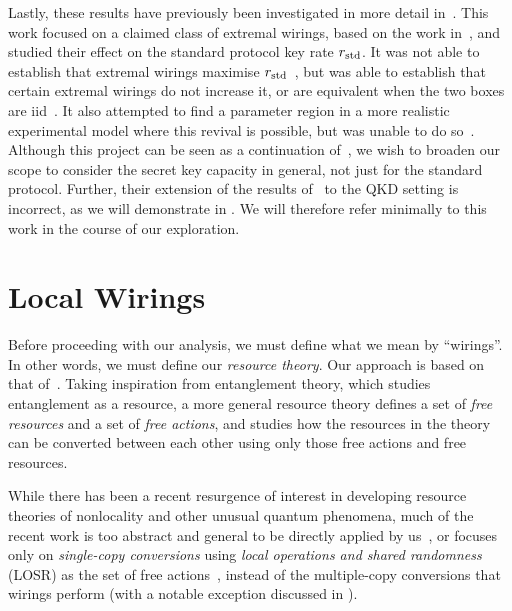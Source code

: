 \documentclass[10pt, a4paper]{article}
\numberwithin{equation}{section} %
\theoremstyle{definition}
\theoremstyle{plain}
\newcommand{\?}{\mathrel{?}} %
\newcommand{\std}{\rm std}
\begin{document}
              Lastly, these results have previously been investigated in more detail in~\cite{JanLiThesis}. This work focused on a claimed class of extremal wirings, based on the work in~\cite{ShortEntangleSwap}, and studied their effect on the standard protocol key rate \(r_{\std}\). It was not able to establish that extremal wirings maximise \(r_{\std}\)~\cite[Sec. 7.2]{JanLiThesis}, but was able to establish that certain extremal wirings do not increase it, or are equivalent when the two boxes are iid~\cite[Sec. 7.3]{JanLiThesis}. It also attempted to find a parameter region in a more realistic experimental model where this revival is possible, but was unable to do so~\cite[Sec. 9]{JanLiThesis}. Although this project can be seen as a continuation of~\cite{JanLiThesis}, we wish to broaden our scope to consider the secret key capacity in general, not just for the standard protocol. Further, their extension of the results of~\cite{ShortEntangleSwap} to the QKD setting is incorrect, as we will demonstrate in . We will therefore refer minimally to this work in the course of our exploration.

              \section{Local Wirings}\label{sec:locwir}

              Before proceeding with our analysis, we must define what we mean by ``wirings''. In other words, we must define our \emph{resource theory}. Our approach is based on that of~\cite{NonclassicalCausation}. Taking inspiration from entanglement theory, which studies entanglement as a resource, a more general resource theory defines a set of \emph{free resources} and a set of \emph{free actions}, and studies how the resources in the theory can be converted between each other using only those free actions and free resources.

              While there has been a recent resurgence of interest in developing resource theories of nonlocality and other unusual quantum phenomena, much of the recent work is too abstract and general to be directly applied by us~\cite{Monotones, TypeIndepLOSR}, or focuses only on \emph{single-copy conversions} using \emph{local operations and shared randomness} (LOSR) as the set of free actions~\cite{NonclassicalCausation, TraceDistNL, NLMeas}, instead of the multiple-copy conversions that wirings perform (with a notable exception discussed in ).
\end{document}
